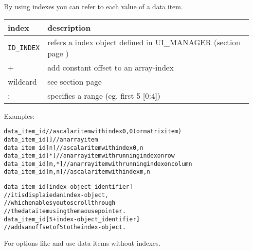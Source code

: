 By using indexes you can refer to each value of a data item. \\

\begin{tabularx}{\textwidth}{l|X}
index                   & description \\ 
\hline
\verb+ID_INDEX+         & refers a index object defined in UI\_MANAGER (section \nameref{sec:uiindex} page \pageref{sec:uiindex}) \\
+                       & add constant offset to an array-index \\
wildcard                & see section \nameref{sec:wildcards} page \pageref{sec:wildcards} \\
:                       & specifies a range (eg. first 5 [0:4]) \\
\end{tabularx}
\vspace{0.5cm}

Examples: \\

\begin{boxedminipage}[t]{\linewidth}
\begin{alltt}
data_item_id      // a scalar item with index 0,0 (or matrix item)
data_item_id[ ]   // an array item
data_item_id[n]   // a scalar item with index 0,n
data_item_id[*]   // an array item with running index on row
data_item_id[m,*] // an array item with running index on column
data_item_id[m,n] // a scalar item with index m,n

data_item_id[index-object_identifier]
                       // it is displaied an index-object,
                       // which enables you to scroll through
                       // the data item using the maouse pointer. \\

data_item_id[ 5 + index-object_identifier]
                       // adds an offset of 5 to the index-object. \\
\end{alltt}
\end{boxedminipage}

\vspace{0.5cm}

For options like \LABEL{} and \UNIT{} use data items without indexes.
\vspace{0.5cm}
